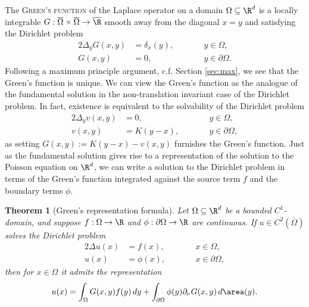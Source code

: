 \documentclass[reqno]{amsart}
\newtheorem{theorem}{Theorem}
\theoremstyle{definition}
\theoremstyle{remark}
\newcounter{problem}[section]	\declaretheorem[style=thmrecbox,name=Problem, numberlike=problem]{statement}
\renewcommand{\emph}{\textsc}
\begin{document}
The \emph{Green's function} of the Laplace operator on a domain $\Omega \subseteq \R^d$ is a locally integrable $G: \overline\Omega \times \overline\Omega \to \overline\R$ smooth away from the diagonal $x = y$ and satisfying the Dirichlet problem
	\begin{alignat*}{2}
		\Delta_y G(x, y)
			&= \delta_x (y), \qquad  && y \in \Omega, \\
		G(x, y)
			&= 0,					\qquad && y \in \partial \Omega.
	\end{alignat*} 
Following a maximum principle argument, c.f. Section \ref{sec:max}, we see that the Green's function is unique. We can view the Green's function as the analogue of the fundamental solution in the non-translation invariant case of the Dirichlet problem. In fact, existence is equivalent to the solvability of the Dirichlet problem
	\begin{alignat*}{2}
		\Delta_y v(x, y)
			&= 0, \qquad  && y \in \Omega, \\
		v(x, y)
			&= K(y - x),					\qquad && y \in \partial \Omega,
	\end{alignat*} 
as setting $G(x, y) := K(y - x) - v(x, y)$ furnishes the Green's function. Just as the fundamental solution gives rise to a representation of the solution to the Poisson equation on $\R^d$, we can write a solution to the Dirichlet problem in terms of the Green's function integrated against the source term $f$ and the boundary terms $\phi$. 

	
\begin{theorem}[Green's representation formula]
	Let $\Omega \subseteq \R^d$ be a bounded $C^1$-domain, and suppose $f : \Omega \to \R$ and $\phi : \partial \Omega \to \R$ are continuous. If $u \in C^2 (\overline \Omega)$ solves the Dirichlet problem 
		\begin{alignat*}{2}
		\Delta u(x)
			&= f(x), \qquad  && x \in \Omega, \\
		u(x)
			&= \phi(x),					\qquad && x \in \partial \Omega,
	\end{alignat*} 
	then for $x \in \Omega$ it admits the representation
		\[ u(x) = \int_\Omega G(x, y) f(y) \, dy + \int_{\partial \Omega}\phi(y) \partial_\nu G(x, y) \, d\area (y). \]	
\end{theorem}
\end{document}
